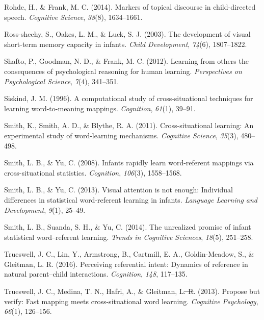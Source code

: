 \documentclass[authoryear, review]{elsarticle}
\providecommand{\DIFdeltex}[1]{{\protect\color{red}\sout{#1}}}                      %
\providecommand{\DIFdelbegin}{} %
\providecommand{\DIFdelend}{} %
\providecommand{\DIFdel}[1]{\texorpdfstring{\DIFdeltex{#1}}{}} %
\begin{document}
\hypertarget{ref-rohde2014markers}{}
Rohde, H., \& Frank, M. C. (2014). Markers of topical discourse in
child-directed speech. \emph{Cognitive Science}, \emph{38}(8),
1634--1661.

\hypertarget{ref-ross2003development}{}
Ross-sheehy, S., Oakes, L. M., \& Luck, S. J. (2003). The development of
visual short-term memory capacity in infants. \emph{Child Development},
\emph{74}(6), 1807--1822.

\hypertarget{ref-shafto2012learning}{}
Shafto, P., Goodman, N. D., \& Frank, M. C. (2012). Learning from others
the consequences of psychological reasoning for human learning.
\emph{Perspectives on Psychological Science}, \emph{7}(4), 341--351.

\hypertarget{ref-siskind1996computational}{}
Siskind, J. M. (1996). A computational study of cross-situational
techniques for learning word-to-meaning mappings. \emph{Cognition},
\emph{61}(1), 39--91.

\hypertarget{ref-smith2011cross}{}
Smith, K., Smith, A. D., \& Blythe, R. A. (2011). Cross-situational
learning: An experimental study of word-learning mechanisms.
\emph{Cognitive Science}, \emph{35}(3), 480--498.

\hypertarget{ref-smith2008infants}{}
Smith, L. B., \& Yu, C. (2008). Infants rapidly learn word-referent
mappings via cross-situational statistics. \emph{Cognition},
\emph{106}(3), 1558--1568.

\hypertarget{ref-smith2013visual}{}
Smith, L. B., \& Yu, C. (2013). Visual attention is not enough:
Individual differences in statistical word-referent learning in infants.
\emph{Language Learning and Development}, \emph{9}(1), 25--49.

\hypertarget{ref-smith2014unrealized}{}
Smith, L. B., Suanda, S. H., \& Yu, C. (2014). The unrealized promise of
infant statistical word--referent learning. \emph{Trends in Cognitive
Sciences}, \emph{18}(5), 251--258.

\hypertarget{ref-trueswell2016perceiving}{}
Trueswell, J. C., Lin, Y., Armstrong, B., Cartmill, E. A.,
Goldin-Meadow, S., \& Gleitman, L. R. (2016). Perceiving referential
intent: Dynamics of reference in natural parent--child interactions.
\emph{Cognition}, \emph{148}, 117--135.

\hypertarget{ref-trueswell2013propose}{}
Trueswell, J. C., Medina, T. N., Hafri, A., \& Gleitman, L\DIFdelbegin \DIFdel{. R}\DIFdelend . (2013).
Propose but verify: Fast mapping meets cross-situational word learning.
\emph{Cognitive Psychology}, \emph{66}(1), 126--156.
\end{document}
